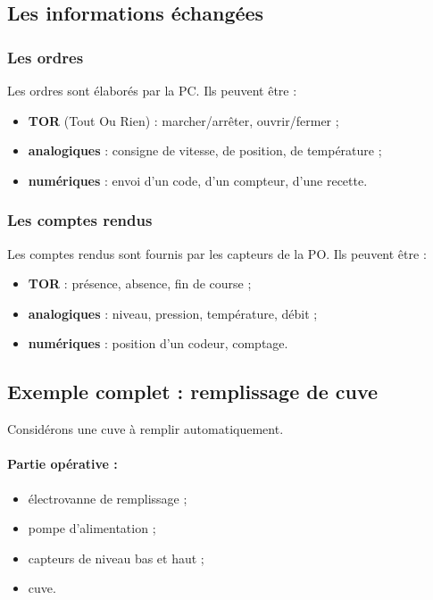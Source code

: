 \subsection{Les informations échangées}

\subsubsection{Les ordres}

Les ordres sont élaborés par la PC. Ils peuvent être :

\begin{itemize}
    \item \textbf{TOR} (Tout Ou Rien) : marcher/arrêter, ouvrir/fermer ;
    \item \textbf{analogiques} : consigne de vitesse, de position, de température ;
    \item \textbf{numériques} : envoi d'un code, d'un compteur, d'une recette.
\end{itemize}

\subsubsection{Les comptes rendus}

Les comptes rendus sont fournis par les capteurs de la PO. Ils peuvent être :

\begin{itemize}
    \item \textbf{TOR} : présence, absence, fin de course ;
    \item \textbf{analogiques} : niveau, pression, température, débit ;
    \item \textbf{numériques} : position d'un codeur, comptage.
\end{itemize}

\subsection{Exemple complet : remplissage de cuve}

Considérons une cuve à remplir automatiquement.

\paragraph{Partie opérative :}
\begin{itemize}
    \item électrovanne de remplissage ;
    \item pompe d'alimentation ;
    \item capteurs de niveau bas et haut ;
    \item cuve.
\end{itemize}

